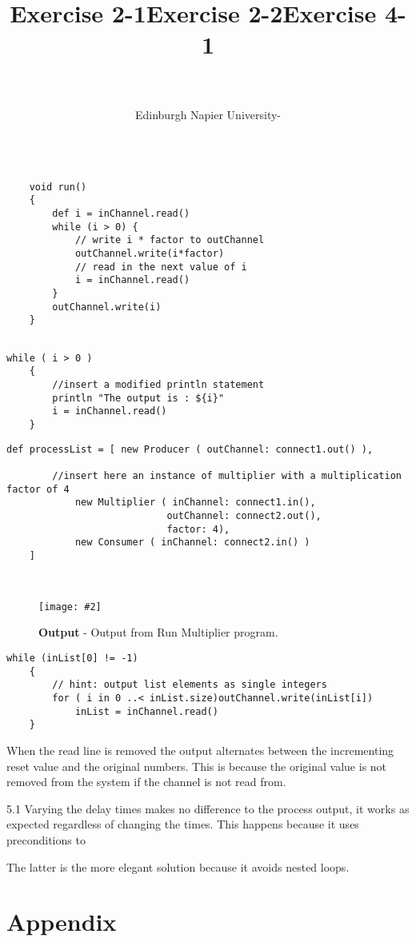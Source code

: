 \documentclass[10pt, a4paper]{article}
\title{\mytitle}
\author{\myauthor\hspace{1em}\\\contact\\Edinburgh Napier University\hspace{0.5em}-\hspace{0.5em}\mymodule}
\date{}
\newcommand{\figuremacro}[5]{
    \begin{figure}[#1]
        \centering
        \texttt{[image: \#2]}
        \caption[#3]{\textbf{#3}#4}
        \label{fig:#2}
    \end{figure}
}
\begin{document}
	\maketitle	

	\title{\textbf{Exercise 2-1}}
	\begin{lstlisting}[caption = "Multiplier.groovy"]

	void run()
	{
		def i = inChannel.read()
		while (i > 0) {
			// write i * factor to outChannel
			outChannel.write(i*factor)
			// read in the next value of i
			i = inChannel.read()
		}
		outChannel.write(i)
	}
		
	\end{lstlisting}
	
	\begin{lstlisting}[caption = "Consumer.groovy"]
	while ( i > 0 )
	{
	    //insert a modified println statement
	    println "The output is : ${i}"
	    i = inChannel.read()
	}
	\end{lstlisting}
	
	\begin{lstlisting}[caption = "RunMultiplier.groovy"]
	def processList = [ new Producer ( outChannel: connect1.out() ),
	
		//insert here an instance of multiplier with a multiplication factor of 4
			new Multiplier ( inChannel: connect1.in(),
							outChannel: connect2.out(),
							factor: 4),
			new Consumer ( inChannel: connect2.in() )
	]

	
	\end{lstlisting}
	
	\figuremacro{H}{2-1}{Output}{ - Output from Run Multiplier program.}{0.4}
	
	\title{\textbf{Exercise 2-2}}
	
	\begin{lstlisting}[caption = "ListToStream.groovy"]
	while (inList[0] != -1)
	{
		// hint: output	list elements as single integers
		for ( i in 0 ..< inList.size)outChannel.write(inList[i])
			inList = inChannel.read()
	}
	\end{lstlisting}
	
	
	
	\title{\textbf{Exercise 4-1}}
	
	When the read line is removed the output alternates between the incrementing reset value and the original numbers. This is because
	the original value is not removed from the system if the channel is not read from.
	
	
	
	5.1 
	Varying the delay times makes no difference to the process output, it works as expected regardless of changing the times. This happens because it uses preconditions to 
   
   
   The latter is the more elegant solution because it avoids nested loops.
   
   
   

\clearpage
\section{Appendix}

		
\end{document}
